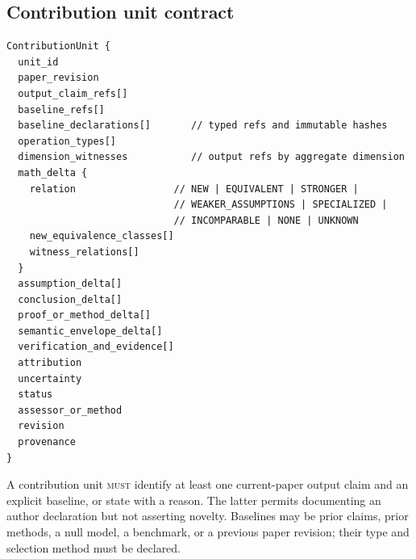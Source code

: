\subsection{Contribution unit contract}

\begin{lstlisting}[style=interface]
ContributionUnit {
  unit_id
  paper_revision
  output_claim_refs[]
  baseline_refs[]
  baseline_declarations[]       // typed refs and immutable hashes
  operation_types[]
  dimension_witnesses           // output refs by aggregate dimension
  math_delta {
    relation                 // NEW | EQUIVALENT | STRONGER |
                             // WEAKER_ASSUMPTIONS | SPECIALIZED |
                             // INCOMPARABLE | NONE | UNKNOWN
    new_equivalence_classes[]
    witness_relations[]
  }
  assumption_delta[]
  conclusion_delta[]
  proof_or_method_delta[]
  semantic_envelope_delta[]
  verification_and_evidence[]
  attribution
  uncertainty
  status
  assessor_or_method
  revision
  provenance
}
\end{lstlisting}

A contribution unit \textsc{must} identify at least one current-paper output claim and an explicit baseline, or state  with a reason. The latter permits documenting an author declaration but not asserting novelty. Baselines may be prior claims, prior methods, a null model, a benchmark, or a previous paper revision; their type and selection method must be declared.

